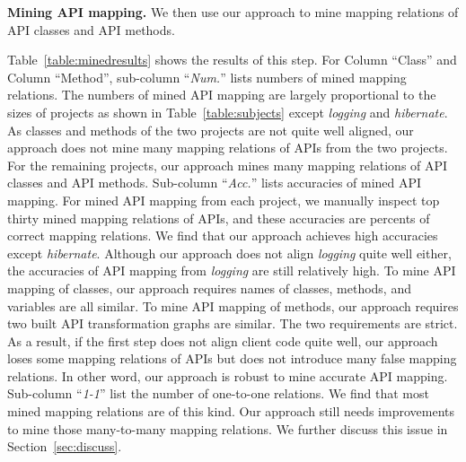 \textbf{Mining API mapping.} We then use our approach to mine
mapping relations of API classes and API methods.

Table~\ref{table:minedresults} shows the results of this step. For
Column ``Class'' and Column ``Method'', sub-column ``\emph{Num.}''
lists numbers of mined mapping relations. The numbers of mined API
mapping are largely proportional to the sizes of projects as shown
in Table~\ref{table:subjects} except \emph{logging} and
\emph{hibernate}. As classes and methods of the two projects are not
quite well aligned, our approach does not mine many mapping
relations of APIs from the two projects. For the remaining projects,
our approach mines many mapping relations of API classes and API
methods. Sub-column ``\emph{Acc.}'' lists accuracies of mined API
mapping. For mined API mapping from each project, we manually
inspect top thirty mined mapping relations of APIs, and these
accuracies are percents of correct mapping relations. We find that
our approach achieves high accuracies except \emph{hibernate}.
Although our approach does not align \emph{logging} quite well
either, the accuracies of API mapping from \emph{logging} are still
relatively high. To mine API mapping of classes, our approach
requires names of classes, methods, and variables are all similar.
To mine API mapping of methods, our approach requires two built API
transformation graphs are similar. The two requirements are strict.
As a result, if the first step does not align client code quite
well, our approach loses some mapping relations of APIs but does not
introduce many false mapping relations. In other word, our approach
is robust to mine accurate API mapping. Sub-column ``\emph{1-1}''
list the number of one-to-one relations. We find that most mined
mapping relations are of this kind. Our approach still needs
improvements to mine those many-to-many mapping relations. We
further discuss this issue in Section~\ref{sec:discuss}.



